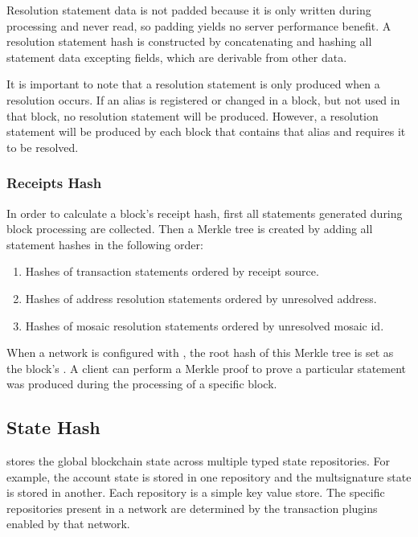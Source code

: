 Resolution statement data is not padded because it is only written during processing and never read, so padding yields no server performance benefit.
A resolution statement hash is constructed by concatenating and hashing all statement data excepting  fields, which are derivable from other data.

It is important to note that a resolution statement is only produced when a resolution occurs.
If an alias is registered or changed in a block, but not used in that block, no resolution statement will be produced.
However, a resolution statement will be produced by each block that contains that alias and requires it to be resolved.

\subsubsection{Receipts Hash}
\label{sec:blocks:receiptshash}

In order to calculate a block's receipt hash, first all statements generated during block processing are collected.
Then a Merkle tree is created by adding all statement hashes in the following order:

\begin{enumerate}
\item{Hashes of transaction statements ordered by receipt source.}
\item{Hashes of address resolution statements ordered by unresolved address.}
\item{Hashes of mosaic resolution statements ordered by unresolved mosaic id.}
\end{enumerate}

When a network is configured with , the root hash of this Merkle tree is set as the block's .
A client can perform a Merkle proof to prove a particular statement was produced during the processing of a specific block.

\subsection{State Hash}
\label{sec:blocks:statehash}

\codenamespace stores the global blockchain state across multiple typed state repositories.
For example, the account state is stored in one repository and the multsignature state is stored in another.
Each repository is a simple key value store.
The specific repositories present in a network are determined by the transaction plugins enabled by that network.

